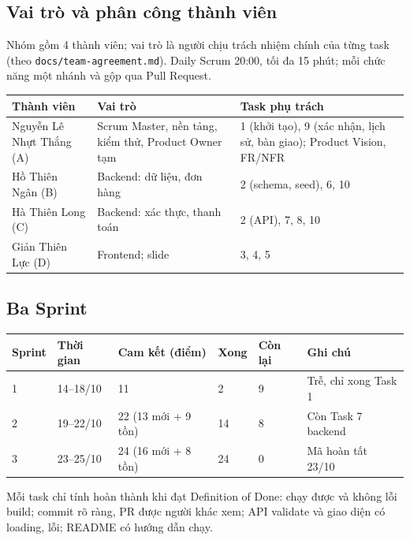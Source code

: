 \documentclass[a4paper]{article}
\begin{document}
\subsection{Vai trò và phân công thành viên}
Nhóm gồm 4 thành viên; vai trò là người chịu trách nhiệm chính của từng task (theo \texttt{docs/team-agreement.md}). Daily Scrum 20:00, tối đa 15 phút; mỗi chức năng một nhánh và gộp qua Pull Request.
\begin{center}
\small\everymath{}
\begin{tabular}{@{}p{3.6cm}p{4.4cm}p{5.5cm}@{}}
\toprule
\textbf{Thành viên} & \textbf{Vai trò} & \textbf{Task phụ trách} \\ \midrule
Nguyễn Lê Nhựt Thắng (A) & Scrum Master, nền tảng, kiểm thử, Product Owner tạm & 1 (khởi tạo), 9 (xác nhận, lịch sử, bàn giao); Product Vision, FR/NFR \\
Hồ Thiên Ngân (B) & Backend: dữ liệu, đơn hàng & 2 (schema, seed), 6, 10 \\
Hà Thiên Long (C) & Backend: xác thực, thanh toán & 2 (API), 7, 8, 10 \\
Giản Thiên Lực (D) & Frontend; slide & 3, 4, 5 \\
\bottomrule
\end{tabular}
\end{center}

\subsection{Ba Sprint}
\begin{center}
\small\everymath{}
\begin{tabular}{@{}p{1.4cm}p{2.0cm}p{3.0cm}p{1.2cm}p{1.5cm}p{3.2cm}@{}}
\toprule
\textbf{Sprint} & \textbf{Thời gian} & \textbf{Cam kết (điểm)} & \textbf{Xong} & \textbf{Còn lại} & \textbf{Ghi chú} \\ \midrule
1 & 14--18/10 & 11 & 2 & 9 & Trễ, chỉ xong Task 1 \\
2 & 19--22/10 & 22 (13 mới + 9 tồn) & 14 & 8 & Còn Task 7 backend \\
3 & 23--25/10 & 24 (16 mới + 8 tồn) & 24 & 0 & Mã hoàn tất 23/10 \\
\bottomrule
\end{tabular}
\end{center}
Mỗi task chỉ tính hoàn thành khi đạt Definition of Done: chạy được và không lỗi build; commit rõ ràng, PR được người khác xem; API validate và giao diện có loading, lỗi; README có hướng dẫn chạy.

\end{document}
